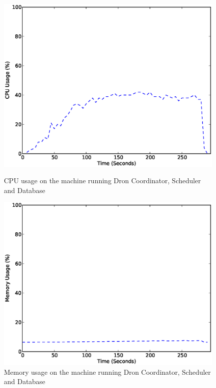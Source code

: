 \documentclass[11pt,a4paper,twoside]{report}
\begin{document}
\begin{figure}[ht]
\begin{minipage}[b]{0.47\linewidth}
\centering
\includegraphics[scale=0.36]{dron-4-sched-lat-cpu}
\caption{CPU usage on the machine running Dron Coordinator, Scheduler and Database}
\label{fig:LatencyFourCpu}
\end{minipage}
\hspace{0.2cm}
\begin{minipage}[b]{0.5\linewidth}
\centering
\includegraphics[scale=0.36]{dron-4-sched-lat-mem}
\caption{Memory usage on the machine running Dron Coordinator, Scheduler and Database}
\label{fig:LatencyFourMem}
\end{minipage}
\end{figure}
\end{document}
